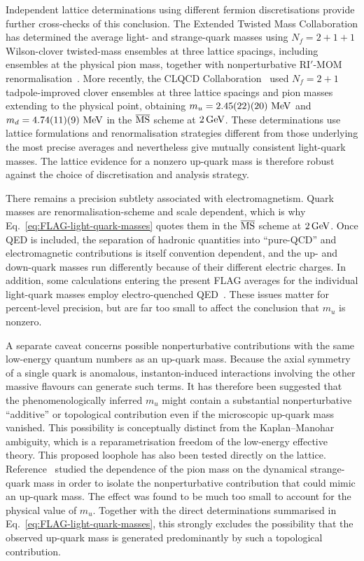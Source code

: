 \documentclass[review]{elsarticle}
\numberwithin{equation}{section}
\numberwithin{table}{section}
\numberwithin{figure}{section}
\begin{document}
Independent lattice determinations using different fermion discretisations provide further cross-checks of this conclusion. The Extended Twisted Mass Collaboration has determined the average light- and strange-quark masses using $N_f=2+1+1$ Wilson-clover twisted-mass ensembles at three lattice spacings, including ensembles at the physical pion mass, together with nonperturbative RI$'$-MOM renormalisation~\cite{ExtendedTwistedMass:2021gbo}. More recently, the CLQCD Collaboration~\cite{CLQCD:2023sdb} used $N_f=2+1$ tadpole-improved clover ensembles at three lattice spacings and pion masses extending to the physical point, obtaining
$m_u=2.45(22)(20)\ {\rm MeV}$ and $m_d=4.74(11)(9)\ {\rm MeV}$ in the $\overline{\rm MS}$ scheme at $2\,{\rm GeV}$. These determinations use lattice formulations and renormalisation strategies different from those underlying the most precise averages and nevertheless give mutually consistent light-quark masses. The lattice evidence for a nonzero up-quark mass is therefore robust against the choice of discretisation and analysis strategy.

There remains a precision subtlety associated with electromagnetism. Quark masses are renormalisation-scheme and scale dependent, which is why Eq.~\eqref{eq:FLAG-light-quark-masses} quotes them in the $\overline{\rm MS}$ scheme at $2\,{\rm GeV}$. Once QED is included, the separation of hadronic quantities into ``pure-QCD'' and electromagnetic contributions is itself convention dependent, and the up- and down-quark masses run differently because of their different electric charges. In addition, some calculations entering the present FLAG averages for the individual light-quark masses employ electro-quenched QED~\cite{FlavourLatticeAveragingGroupFLAG:2024oxs}. These issues matter for percent-level precision, but are far too small to affect the conclusion that $m_u$ is nonzero.

A separate caveat concerns possible nonperturbative contributions with the same low-energy quantum numbers as an up-quark mass. Because the axial symmetry of a single quark is anomalous, instanton-induced interactions involving the other massive flavours can generate such terms. It has therefore been suggested that the phenomenologically inferred $m_u$ might contain a substantial nonperturbative ``additive'' or topological contribution even if the microscopic up-quark mass vanished. This possibility is conceptually distinct from the Kaplan--Manohar ambiguity, which is a reparametrisation freedom of the low-energy effective theory. This proposed loophole has also been tested directly on the lattice. Reference~\cite{Alexandrou:2020bkd} studied the dependence of the pion mass on the dynamical strange-quark mass in order to isolate the nonperturbative contribution that could mimic an up-quark mass. The effect was found to be much too small to account for the physical value of $m_u$. Together with the direct determinations summarised in Eq.~\eqref{eq:FLAG-light-quark-masses}, this strongly excludes the possibility that the observed up-quark mass is generated predominantly by such a topological contribution.
\end{document}
